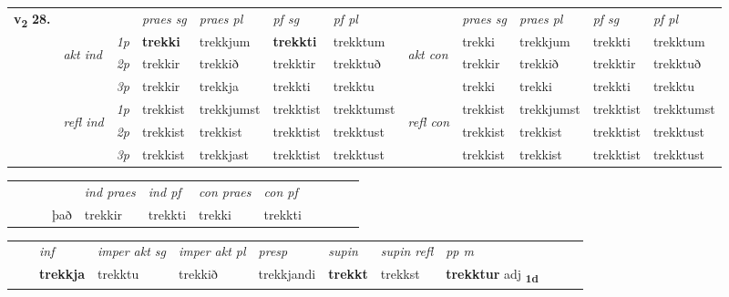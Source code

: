 \begin{tabular}{llllllllllll} \toprule
\multirow{4}{*}{{{\textbf{v{\textsubscript{2}}} \Large{\textbf{28.}}}}}  & &   &  \textit{praes sg}  & \textit{praes pl}  &\textit{ pf sg} & \textit{pf pl} &  &  \textit{praes sg}  & \textit{praes pl}  & \textit{pf sg} & \textit{pf pl } \\*
	\cmidrule{4-7} \cmidrule{9-12}
 & \multirow{3}{*}{\begin{turn}{90}\textit{akt ind}\end{turn}} & {\textit{1p}} & \textbf{trekki} & trekkjum    & \textbf{trekkti} & trekktum & \multirow{3}{*}{\begin{turn}{90}\textit{akt con}\end{turn}} &trekki & trekkjum & trekkti & trekktum\\*
& &  {\textit{2p}} &  trekkir  & trekkið   & trekktir & trekktuð & & trekkir & trekkið & trekktir & trekktuð \\*
& &  {\textit{3p}} & trekkir & trekkja   & trekkti & trekktu & & trekki & trekki& trekkti & trekktu  \\*
\cmidrule{4-7} \cmidrule{9-12}
 &\multirow{3}{*}{\begin{turn}{90}\textit{refl ind}\end{turn}} & {\textit{1p}} & trekkist & trekkjumst    & trekktist & trekktumst & \multirow{3}{*}{\begin{turn}{90}\textit{refl con}\end{turn}}  &trekkist & trekkjumst & trekktist & trekktumst\\*
 &&  {\textit{2p}} &  trekkist  & trekkist   & trekktist & trekktust & &trekkist & trekkist & trekktist & trekktust \\*
& &  {\textit{3p}} & trekkist & trekkjast   & trekktist & trekktust & & trekkist & trekkist& trekktist & trekktust  \\*
\cmidrule{4-7} \cmidrule{9-12}
\end{tabular}


\begin{tabular}{llllllllllll}
 & &  & &  \textit{ind praes} & \textit{ind pf} & \textit{con praes} & \textit{con pf} \\*
&  & & það & trekkir & trekkti & trekki & trekkti \\*
\cmidrule{5-9}
\end{tabular}


\begin{tabular}{llllllllllll}
 & & \textit{inf} & \textit{imper akt sg} & \textit{imper akt pl}   & \textit{presp} & \textit{supin} & \textit{supin refl} & \textit{pp m}     \\*
  & & \textbf{trekkja} & trekktu  & trekkið   & trekkjandi &  \textbf{trekkt} & trekkst & \textbf{trekktur} adj \textbf{\textsubscript{1d}} \\*
\cmidrule{1-12}
\end{tabular}



